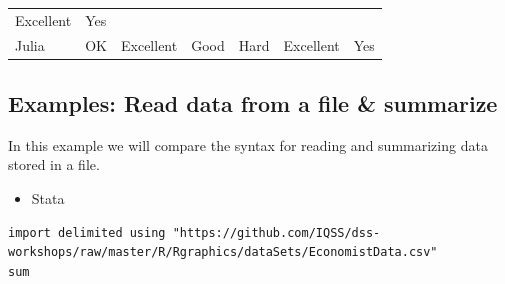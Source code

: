 \documentclass[]{book}
\providecommand{\tightlist}{%
  \setlength{\itemsep}{0pt}\setlength{\parskip}{0pt}}
\begin{document}
\begin{longtable}[]{@{}lllllll@{}}
\begin{minipage}[t]{0.17\columnwidth}
Excellent\strut
\end{minipage} & \begin{minipage}[t]{0.05\columnwidth}\raggedright\strut
Yes\strut
\end{minipage}\tabularnewline
\begin{minipage}[t]{0.08\columnwidth}\raggedright\strut
Julia\strut
\end{minipage} & \begin{minipage}[t]{0.11\columnwidth}\raggedright\strut
OK\strut
\end{minipage} & \begin{minipage}[t]{0.13\columnwidth}\raggedright\strut
Excellent\strut
\end{minipage} & \begin{minipage}[t]{0.16\columnwidth}\raggedright\strut
Good\strut
\end{minipage} & \begin{minipage}[t]{0.11\columnwidth}\raggedright\strut
Hard\strut
\end{minipage} & \begin{minipage}[t]{0.17\columnwidth}\raggedright\strut
Excellent\strut
\end{minipage} & \begin{minipage}[t]{0.05\columnwidth}\raggedright\strut
Yes\strut
\end{minipage}\tabularnewline
\bottomrule
\end{longtable}

\subsection{Examples: Read data from a file \&
summarize}\label{examples-read-data-from-a-file-summarize}

In this example we will compare the syntax for reading and summarizing
data stored in a file.

\begin{itemize}
\tightlist
\item
  Stata
\end{itemize}

\begin{verbatim}
import delimited using "https://github.com/IQSS/dss-workshops/raw/master/R/Rgraphics/dataSets/EconomistData.csv"
sum
\end{verbatim}
\end{document}
